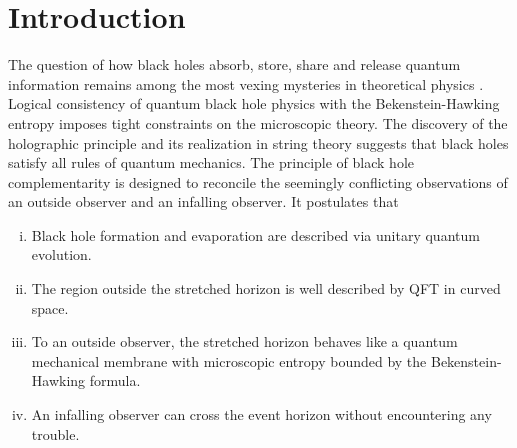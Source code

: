 \documentclass[12pt]{article}%
\def\spc{\hspace{.5pt}}
\begin{document}
\def\oneovertN{{1\over N}} %
\def\oneoversqN{{1 \over \sqrt{N} }} %
\def\oneoverZ{\frac{\raisebox{-1pt}{\small $1$}}{\raisebox{.5pt}{\small $Z$\spc}}}
\def\oneoverNZ{\frac{\raisebox{-1pt}{\small $1$}}{\raisebox{.5pt}{\small $N\nspc Z$\spc}}}
\def\iii{i}
\def\jjj{j}
\def\bh{{\mbox{\fontsize{7pt}{.7pt}{$BH$}}}}%

\tableofcontents

\newpage

\section{Introduction}

The question of how black holes absorb, store, share and release quantum information remains among the most vexing mysteries
in theoretical physics \cite{hawking,unruh}.  Logical consistency of quantum black hole physics with the Bekenstein-Hawking entropy  
\cite{bekenstein,hawking} imposes tight constraints on the microscopic theory. The discovery of the holographic principle  
\cite{hoofthologram}\cite{susskindhologram} and its realization in string theory \cite{maldacena} suggests that  black holes satisfy all rules of 
quantum mechanics.   The principle of black hole complementarity \cite{susskindcompl} is designed to reconcile the seemingly 
conflicting observations of  an outside observer and an infalling observer. It postulates that
\begin{enumerate}[(i)]
\item Black hole formation and evaporation are described via unitary quantum evolution.

\item The region outside the stretched horizon is well described by QFT in curved space.

\item To an outside observer, the stretched horizon behaves like a quantum mechanical membrane
with microscopic entropy bounded by the Bekenstein-Hawking formula.

\item An infalling observer can cross the event horizon without encountering any trouble.
\end{enumerate}
\end{document}
